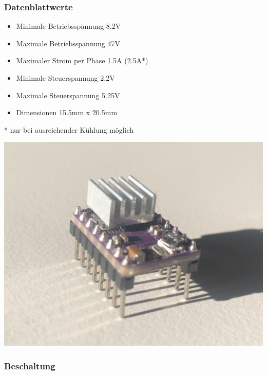 \subsubsection{Datenblattwerte}

\begin{minipage}{.6\textwidth}
    \begin{itemize}
        \item Minimale Betriebsspannung 8.2V
        \item Maximale Betriebsspannung 47V
        \item Maximaler Strom per Phase 1.5A (2.5A*)
        \item Minimale Steuerspannung 2.2V
        \item Maximale Steuerspannung 5.25V
        \item Dimensionen 15.5mm x 20.5mm
    \end{itemize}
    * nur bei ausreichender Kühlung möglich
\end{minipage}
\begin{minipage}{.4\textwidth}
    \centering
    \includegraphics[scale=0.08]{fig/elektro/StepperDriver.jpg}
\end{minipage}

\subsubsection{Beschaltung}

